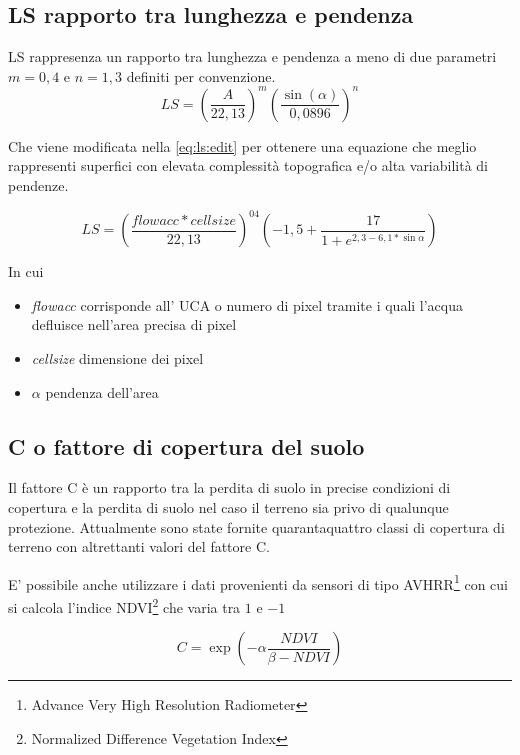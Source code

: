 \subsection{LS rapporto tra lunghezza e pendenza}
LS rappresenza un rapporto tra lunghezza e pendenza a meno di due parametri $m=0,4$ e $n=1,3$ definiti per convenzione.
\begin{equation}\label{eq:ls}
	LS = \left(  \dfrac{A}{22,13} \right)^m
	\left(  \dfrac{\sin(\alpha)}{0,0896} \right)^n
\end{equation}

Che viene modificata nella \eqref{eq:ls:edit} per ottenere una equazione che meglio rappresenti superfici con elevata complessità topografica e/o alta variabilità di pendenze.

\begin{equation}\label{eq:ls:edit}
LS=\left( \dfrac{flowacc * cellsize}{22,13}\right)^{04} \left( -1,5+\dfrac{17}{1+ e^{2,3-6,1*\sin{\alpha}}} \right)
\end{equation}

In cui
\begin{itemize}
	\item \textit{flowacc} corrisponde all' UCA  o numero di pixel tramite i quali l'acqua defluisce nell'area precisa di pixel
	\item \textit{cellsize} dimensione dei pixel
	\item \textit{$\alpha$} pendenza dell'area
\end{itemize}

\subsection{C o fattore di copertura del suolo}
Il fattore C è un rapporto tra la perdita di suolo in precise condizioni di copertura e la perdita di suolo nel caso il terreno sia privo di qualunque protezione.
Attualmente sono state fornite quarantaquattro classi di copertura di terreno con altrettanti valori del fattore C.

E' possibile anche utilizzare i dati provenienti da sensori di tipo AVHRR\footnote{Advance Very High Resolution Radiometer} con cui si calcola l'indice  NDVI\footnote{Normalized Difference Vegetation Index} che varia tra $1$ e $-1$

\begin{equation}\label{eq:c}
	C=\exp\left( -\alpha \dfrac{NDVI}{\beta -NDVI} \right)
\end{equation}

